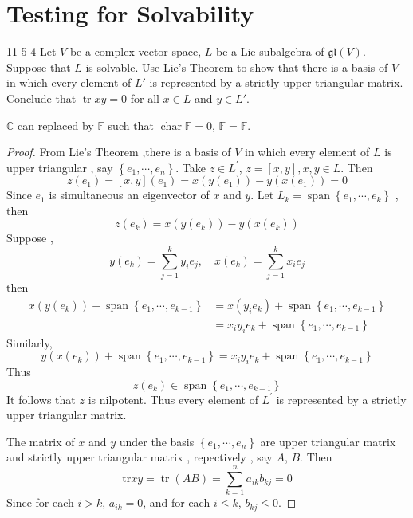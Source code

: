 \documentclass[../main.tex]{subfiles}
\begin{document}
\section{Testing for Solvability}

\begin{exercise}{}{11-5-4}
    Let \(  V  \) be a complex vector space, \(  L  \) be a Lie subalgebra of \(  \mathfrak{gl}\left( V \right)   \).   Suppose that $L$ is solvable. Use Lie's Theorem to show that there is a basis of $V$ in which every element of $L'$ is represented by a strictly upper triangular matrix. Conclude that $\operatorname{tr} xy = 0$ for all $x \in L$ and $y \in L'$.
\end{exercise}
\begin{remark}
    \(  \mathbb{C}   \) can replaced by \(  \mathbb{F}  \) such that \(  \operatorname{char}\mathbb{F}= 0  \), \(  \bar{\mathbb{F}}= \mathbb{F}  \).    
\end{remark}
\begin{proof}
    From Lie's Theorem ,there is a basis of \(  V  \) in which every element of \(  L  \) is upper triangular  , say  \(  \left\{ e_1,\cdots ,e_{n} \right\}  \). Take \(  z \in L^{\prime}   \), \(  z= \left[ x,y \right], x,y \in L   \). Then \[
    z\left( e_{1} \right)= [x,y]\left( e_1 \right)= x\left( y\left( e_1 \right)  \right)-y\left( x\left( e_1 \right)  \right)= 0    
    \]Since \(  e_1  \) is simultaneous an eigenvector of \( x   \) and \(  y  \). Let \(  L_{k}= \operatorname{span}\left\{ e_1,\cdots ,e_{k} \right\}  \) , then \[
  z\left( e_{k} \right)= x\left( y\left( e_{k} \right)  \right)-y\left( x\left( e_{k} \right)  \right)   
    \]    Suppose , \[
    y\left( e_{k} \right)= \sum _{j= 1}^{k}y_{i}e_{j},\quad x\left( e_{k} \right)= \sum _{j= 1}^{k}x_{i}e_{j}  
    \]then \[
  \begin{aligned}
    x\left( y\left( e_{k} \right)  \right)+ \operatorname{span}\left\{ e_1,\cdots ,e_{k-1} \right\}&= x\left( y_{i}e_{k} \right)+ \operatorname{span}\left\{ e_1,\cdots ,e_{k-1} \right\} \\ 
     &= x_{i}y_{i}e_{k}+ \operatorname{span}\left\{ e_1,\cdots ,e_{k-1} \right\}
  \end{aligned}  
    \] Similarly, \[
    y\left( x\left( e_{k} \right)  \right)+ \operatorname{span}\left\{ e_1,\cdots ,e_{k-1} \right\}= x_{i}y_{i}e_{k}+ \operatorname{span}\left\{ e_1,\cdots ,e_{k-1} \right\} 
    \]Thus \[
    z\left( e_{k} \right)\in \operatorname{span}\left\{ e_1,\cdots ,e_{k-1} \right\} 
    \]It follows that \(  z  \) is  nilpotent. Thus every element of \(  L^{\prime}   \) is represented by a strictly upper triangular matrix. 

    The matrix of \(  x  \) and \(  y  \) under the basis \(  \left\{  e_1,\cdots,e_n  \right\}  \) are upper triangular matrix and strictly upper triangular matrix , repectively  , say \(  A  \), \(  B  \). Then \[
    \mathrm{tr}xy= \operatorname{tr}\left( AB \right)= \sum _{k= 1}^{n}a_{ik}b_{kj}= 0 
    \] Since for each \(  i> k  \), \(  a_{ik}= 0  \), and for each \(  i\le k  \), \(  b_{kj}\le 0  \).       
\end{proof}
\end{document}
